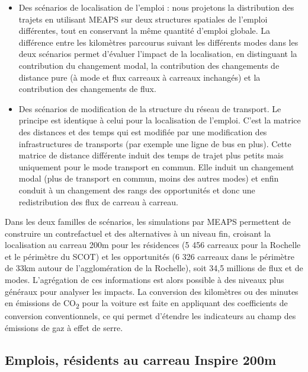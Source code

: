 \documentclass[
  10pt,
  a4paper,
  numbers=noendperiod,
  DIV=12]{scrartcl}
\begin{document}
\begin{itemize}
\item
  Des scénarios de localisation de l'emploi : nous projetons la
  distribution des trajets en utilisant MEAPS sur deux structures
  spatiales de l'emploi différentes, tout en conservant la même quantité
  d'emploi globale. La différence entre les kilomètres parcourus suivant
  les différents modes dans les deux scénarios permet d'évaluer l'impact
  de la localisation, en distinguant la contribution du changement
  modal, la contribution des changements de distance pure (à mode et
  flux carreaux à carreaux inchangés) et la contribution des changements
  de flux.
\item
  Des scénarios de modification de la structure du réseau de transport.
  Le principe est identique à celui pour la localisation de l'emploi.
  C'est la matrice des distances et des temps qui est modifiée par une
  modification des infrastructures de transports (par exemple une ligne
  de bus en plus). Cette matrice de distance différente induit des temps
  de trajet plus petits mais uniquement pour le mode transport en
  commun. Elle induit un changement modal (plus de transport en commun,
  moins des autres modes) et enfin conduit à un changement des rangs des
  opportunités et donc une redistribution des flux de carreau à carreau.
\end{itemize}

Dans les deux familles de scénarios, les simulations par MEAPS
permettent de construire un contrefactuel et des alternatives à un
niveau fin, croisant la localisation au carreau 200m pour les résidences
(5 456 carreaux pour la Rochelle et le périmètre du SCOT) et les
opportunités (6 326 carreaux dans le périmètre de 33km autour de
l'agglomération de la Rochelle), soit 34,5 millions de flux et de modes.
L'agrégation de ces informations est alors possible à des niveaux plus
généraux pour analyser les impacts. La conversion des kilomètres ou des
minutes en émissions de CO\textsubscript{2} pour la voiture est faite en
appliquant des coefficients de conversion conventionnels, ce qui permet
d'étendre les indicateurs au champ des émissions de gaz à effet de
serre.

\hypertarget{emplois-ruxe9sidents-au-carreau-inspire-200m}{%
\subsection{Emplois, résidents au carreau Inspire
200m}\label{emplois-ruxe9sidents-au-carreau-inspire-200m}}
\end{document}
